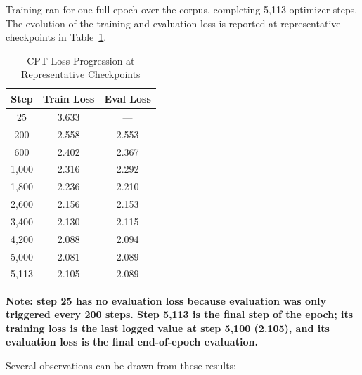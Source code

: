 \documentclass[12pt,a4paper]{report}
\begin{document}
Training ran for one full epoch over the corpus, completing 5,113 optimizer
steps. The evolution of the training and evaluation loss is reported at
representative checkpoints in Table~\ref{tab:cpt_loss}.

\begin{table}[h]
\centering
\caption{CPT Loss Progression at Representative Checkpoints}
\label{tab:cpt_loss}
\begin{tabular}{ccc}
\toprule
\textbf{Step} & \textbf{Train Loss} & \textbf{Eval Loss} \\
\midrule
25      & 3.633 & ---   \\
200     & 2.558 & 2.553 \\
600     & 2.402 & 2.367 \\
1{,}000 & 2.316 & 2.292 \\
1{,}800 & 2.236 & 2.210 \\
2{,}600 & 2.156 & 2.153 \\
3{,}400 & 2.130 & 2.115 \\
4{,}200 & 2.088 & 2.094 \\
5{,}000 & 2.081 & 2.089 \\
5{,}113 & 2.105 & 2.089 \\
\bottomrule
\end{tabular}
\end{table}

\noindent\textbf{Note: step 25 has no evaluation loss because evaluation was
only triggered every 200 steps. Step 5,113 is the final step of the epoch;
its training loss is the last logged value at step 5,100 (2.105), and its
evaluation loss is the final end-of-epoch evaluation.}

Several observations can be drawn from these results:
\end{document}

